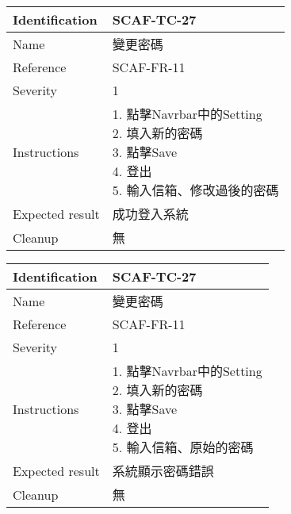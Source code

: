 \documentclass{report}
\begin{document}
\begin{tabularx}{0.9\textwidth}{
  |p{}%
  |p{}|%
  }
  \hline
  \centering Identification &  SCAF-TC-27 \\
  \hline
  \centering Name & 變更密碼 \\
  \hline
  \centering Reference & SCAF-FR-11 \\
  \hline
  \centering Severity & 1 \\
  \hline
  \centering Instructions & 
  \makecell{
    1. 點擊Navrbar中的Setting \\
    2. 填入新的密碼 \\
    3. 點擊Save \\
    4. 登出 \\
    5. 輸入信箱、修改過後的密碼
  }\\
  \hline
  \centering Expected result & 成功登入系統 \\
  \hline
  \centering Cleanup & 無 \\
  \hline
\end{tabularx}
\newline\newline

\begin{tabularx}{0.9\textwidth}{
  |p{}%
  |p{}|%
  }
  \hline
  \centering Identification &  SCAF-TC-27 \\
  \hline
  \centering Name & 變更密碼 \\
  \hline
  \centering Reference & SCAF-FR-11 \\
  \hline
  \centering Severity & 1 \\
  \hline
  \centering Instructions & 
  \makecell{
    1. 點擊Navrbar中的Setting \\
    2. 填入新的密碼 \\
    3. 點擊Save \\
    4. 登出 \\
    5. 輸入信箱、原始的密碼
  }\\
  \hline
  \centering Expected result & 系統顯示密碼錯誤 \\
  \hline
  \centering Cleanup & 無 \\
  \hline
\end{tabularx}
\newline\newline
\end{document}

